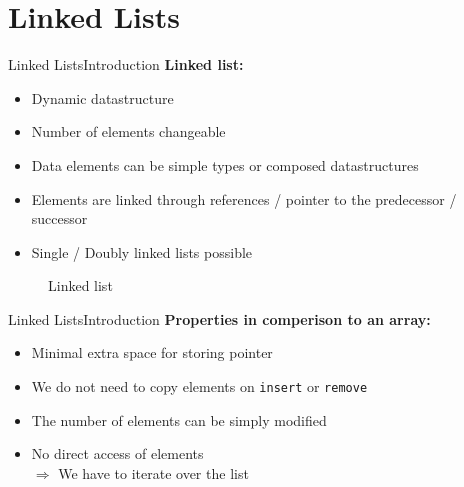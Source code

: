 \section{Linked Lists}

\begin{frame}{Linked Lists}{Introduction}
  \textbf{Linked list:}
  \begin{itemize}
    \item<2->
      Dynamic datastructure
    \item<3->
      Number of elements changeable
    \item<4->
      Data elements can be simple types or composed datastructures
    \item<5->
      Elements are linked through references / pointer to the predecessor /
      successor
    \item<6->
      Single / Doubly linked lists possible
  \end{itemize}
  \begin{figure}
    
    \caption{Linked list}
    \label{fig:linked_list:singly_linked_list}
  \end{figure}
\end{frame}


\begin{frame}{Linked Lists}{Introduction}
  \textbf{Properties in comperison to an array:}
  \begin{itemize}
    \item<2->
      Minimal extra space for storing pointer
    \item<3->
      We do not need to copy elements on {\color{Mittel-Blau}\texttt{insert}}
      or {\color{Mittel-Blau}\texttt{remove}}
    \item<4->
      The number of elements can be simply modified 
    \item<5->
      No direct access of elements\\
      $\Rightarrow$ We have to iterate over the list
  \end{itemize}
\end{frame}


